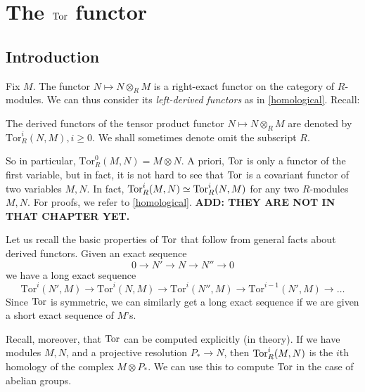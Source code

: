 \section{The $\operatorname{Tor}$ functor}
 

\subsection{Introduction}
Fix $M$. The functor $N \mapsto N \otimes_R M$ is a right-exact functor on the
category of $R$-modules. We can thus consider its \emph{left-derived functors}
as in \cref{homological}. 
Recall:

\begin{definition} 
The derived functors of the tensor product functor $N \mapsto N \otimes_R M$ are denoted by
$\mathrm{Tor} _R^i( N, M), i \geq 0$.  We shall sometimes denote omit the
subscript $R$.
\end{definition} 

So in particular, $\mathrm{Tor} _R^0(M,N) = M \otimes N$.  
A priori, $\operatorname{Tor}$ is only a functor of the first variable, but in fact, it is
not hard to see that $\operatorname{Tor}$ is a covariant functor of two variables $M, N$. 
In fact, $\operatorname{Tor}_R^i(M, N) \simeq \operatorname{Tor}_R^i(N, M)$ for any two $R$-modules $M, N$.
For proofs, we refer to \cref{homological}. \textbf{ADD: THEY ARE NOT IN THAT
CHAPTER YET.}

Let us recall the basic properties of $\operatorname{Tor}$ that follow from general facts
about derived functors. Given an exact sequence
\[ 0 \to N' \to N \to N'' \to 0 \]
we have a long exact sequence
\[ \mathrm{Tor} ^i(N',M) \to \mathrm{Tor} ^i(N,M) \to \mathrm{Tor} ^i(N'',M ) \to \mathrm{Tor} ^{i-1}(N',M) \to \dots \]
Since $\operatorname{Tor}$ is symmetric, we can similarly get a long exact sequence if we
are given a short exact sequence of $M$'s.

Recall, moreover, that $\operatorname{Tor}$ can be  computed explicitly (in theory). 
If we have modules $M, N$, and a projective resolution $P_* \to N$, then
$\operatorname{Tor}_R^i(M,N)$ is the $i$th homology of the complex $M \otimes P_*$. 
We can use this to compute $\operatorname{Tor}$ in the case of abelian groups.

